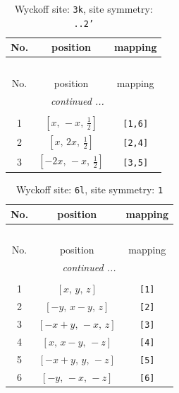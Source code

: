 \documentclass[fleqn,8pt]{jsarticle}
\begin{document}
\begin{longtable}{ccc}
\caption{Wyckoff site: {\tt 3k}, site symmetry: {\tt ..2'}}
 \\
 \hline \hline
No. & position & mapping \\ \hline \endfirsthead

\multicolumn{2}{l}{\tablename\ \thetable{}} \\
 \hline \hline
No. & position & mapping \\ \hline \endhead

 \hline \hline
\multicolumn{2}{r}{\footnotesize\it continued ...} \\ \endfoot

 \hline \hline
\multicolumn{2}{r}{} \\ \endlastfoot

1 & $\left[ x,\, - x,\, \frac{1}{2} \right]$ & {\tt [1,6]} \\ \hline
2 & $\left[ x,\, 2 x,\, \frac{1}{2} \right]$ & {\tt [2,4]} \\ \hline
3 & $\left[ - 2 x,\, - x,\, \frac{1}{2} \right]$ & {\tt [3,5]} \\
\end{longtable}
\renewcommand{\arraystretch}{1.2}
\begin{longtable}{ccc}
\caption{Wyckoff site: {\tt 6l}, site symmetry: {\tt 1}}
 \\
 \hline \hline
No. & position & mapping \\ \hline \endfirsthead

\multicolumn{2}{l}{\tablename\ \thetable{}} \\
 \hline \hline
No. & position & mapping \\ \hline \endhead

 \hline \hline
\multicolumn{2}{r}{\footnotesize\it continued ...} \\ \endfoot

 \hline \hline
\multicolumn{2}{r}{} \\ \endlastfoot

1 & $\left[ x,\, y,\, z \right]$ & {\tt [1]} \\ \hline
2 & $\left[ - y,\, x - y,\, z \right]$ & {\tt [2]} \\ \hline
3 & $\left[ - x + y,\, - x,\, z \right]$ & {\tt [3]} \\ \hline
4 & $\left[ x,\, x - y,\, - z \right]$ & {\tt [4]} \\ \hline
5 & $\left[ - x + y,\, y,\, - z \right]$ & {\tt [5]} \\ \hline
6 & $\left[ - y,\, - x,\, - z \right]$ & {\tt [6]} \\
\end{longtable}
\end{document}
